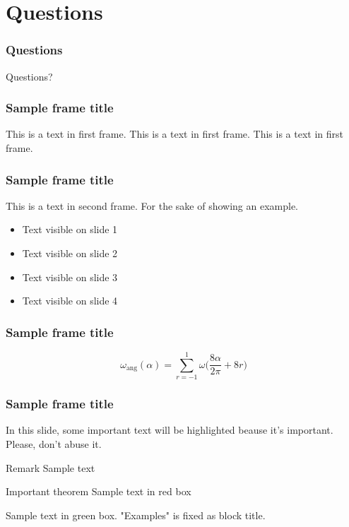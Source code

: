 \documentclass[aspectratio=169]{beamer}
\begin{document}
    
        \section{Questions}
    \begin{frame} %
        \frametitle{Questions}
        \begin{center}
        \LARGE Questions?
        \end{center}
    \end{frame}

\begin{frame}
\frametitle{Sample frame title}
This is a text in first frame. This is a text in first frame. This is a text in first frame.
\end{frame}


\begin{frame}
\frametitle{Sample frame title}
This is a text in second frame. 
For the sake of showing an example.
 
\begin{itemize}
 \item<1-> Text visible on slide 1
 \item<2-> Text visible on slide 2
 \item<3> Text visible on slide 3
 \item<4-> Text visible on slide 4
\end{itemize}
 
\end{frame}

\begin{frame}
\frametitle{Sample frame title}
\begin{equation}
 \omega_\mathrm{ang}(\alpha) = \sum_{r=-1}^{1} \omega \bigg ( \frac{8\alpha}{2\pi} + 8r \bigg )
\label{eq:wang}
\end{equation}
\end{frame}

\begin{frame}
\frametitle{Sample frame title}
 
In this slide, some important text will be
\alert{highlighted} beause it's important.
Please, don't abuse it.
 
\begin{block}{Remark}
Sample text
\end{block}
 
\begin{alertblock}{Important theorem}
Sample text in red box
\end{alertblock}
 
\begin{examples}
Sample text in green box. "Examples" is fixed as block title.
\end{examples}
\end{frame}
\end{document}
